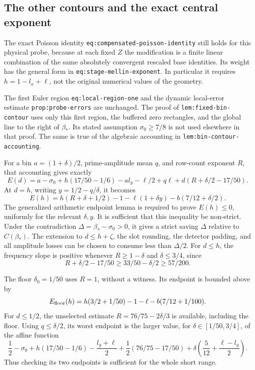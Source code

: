 \documentclass[11pt,a4paper]{article}
\numberwithin{equation}{section}
\theoremstyle{remark}
\begin{document}
\subsection{The other contours and the exact central exponent}

The exact Poisson identity \texttt{eq:compensated-poisson-identity}
still holds for this physical probe, because at each fixed \(Z\) the
modification is a finite linear combination of the same absolutely
convergent rescaled base identities.  Its weight has the general form
in \texttt{eq:stage-mellin-exponent}.  In particular it requires
\(h=1-l_x+\ell\), not the original numerical values of the geometry.

The first Euler region \texttt{eq:local-region-one} and the dynamic
local-error estimate \texttt{prop:probe-errors} are unchanged.  The
proof of \texttt{lem:fixed-bin-contour} uses only this first region,
the buffered zero rectangles, and the global line to the right of
\(\beta_*\).  Its stated assumption \(\sigma_0\ge7/8\) is not used
elsewhere in that proof.  The same is true of the algebraic accounting
in \texttt{lem:bin-contour-accounting}.

For a bin \(a=(1+\delta)/2\), prime-amplitude mean \(q\), and row-count
exponent \(R\), that accounting gives exactly
\begin{equation}
 E(d)=a-\sigma_0+h(17/50-1/6)-a l_y-\ell/2+q\ell
          +d(R+\delta/2-17/50).
 \label{eq:audit-central-exponent}
\end{equation}
At \(d=h\), writing \(y=1/2-q/\delta\), it becomes
\begin{equation}
 E(h)=h(R+\delta+1/2)-1-\ell(1+\delta y)
                  -b(7/12+\delta/2).
 \label{eq:analytic-endpoint}
\end{equation}
The generalized arithmetic endpoint lemma is required to prove
\(E(h)\le0\), uniformly for the relevant \(\delta,y\).  It is sufficient
that this inequality be non-strict.  Under the contradiction
\(\Delta=\beta_*-\sigma_0>0\), it gives a strict saving \(\Delta\)
relative to \(C(\beta_*)\).  The extension to \(d\le h+\zeta\), the
slot rounding, the detector padding, and all amplitude losses can be
chosen to consume less than \(\Delta/2\).  For \(d\le h\), the
frequency slope is positive whenever \(R\ge1-\delta\) and
\(\delta\le3/4\), since
\[
 R+\delta/2-17/50\ge33/50-\delta/2\ge57/200.
\]

The floor \(\delta_0=1/50\) uses \(R=1\), without a witness.  Its
endpoint is bounded above by
\begin{equation}
 E_{\rm floor}(h)
 =h(3/2+1/50)-1-\ell-b(7/12+1/100).
 \label{eq:audit-floor}
\end{equation}
For \(d\le1/2\), the unselected estimate
\(R=76/75-2\delta/3\) is available, including the floor.  Using
\(q\le\delta/2\), its worst endpoint is the larger value, for
\(\delta\in[1/50,3/4]\), of the affine function
\begin{equation}
 \frac12-\sigma_0+h(17/50-1/6)-\frac{l_y+\ell}{2}
 +\frac12(76/75-17/50)
 +\delta\left(\frac5{12}+\frac{\ell-l_y}{2}\right).
 \label{eq:analytic-short}
\end{equation}
Thus checking its two endpoints is sufficient for the whole short range.
\end{document}
